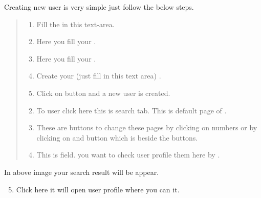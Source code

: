 \documentclass[letterpaper,10pt,english]{sphinxmanual}
\begin{document}
Creating new user is very simple just follow the below steps.
\begin{quote}
\begin{enumerate}
\item {} 
Fill the  in this text-area.

\item {} 
Here you fill your .

\item {} 
Here you fill your .

\item {} 
Create your  (just fill in this text area) .

\item {} 
Click on  button and a new user is created.

\end{enumerate}
\begin{enumerate}
\setcounter{enumi}{1}
\item {} 
To  user click here this is search tab. This is default page of  {\hyperref[\detokenize{manageuser:manage-users}]{}} .

\item {} 
These are buttons to change these pages  by clicking on numbers or by clicking on  and  button which is beside the  buttons.

\item {} 
This is  field. you want to check user profile  them here by  .

\end{enumerate}
\end{quote}

\begin{figure}[htbp]
\centering

\noindent{}
\end{figure}

In above image your search result will be appear.
\begin{enumerate}
\setcounter{enumi}{4}
\item {} 
Click here it will open user profile where you can  it.

\end{enumerate}
\end{document}
